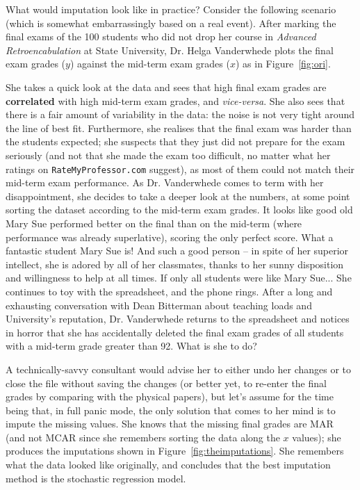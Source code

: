 \afterpage{\FloatBarrier}
What would imputation look like in practice? Consider the following scenario (which is somewhat embarrassingly based on a real event). After marking the final exams of the 100 students who did not drop her course in \textit{Advanced Retroencabulation} at State University, Dr. Helga Vanderwhede plots the final exam grades ($y$) against the mid-term exam grades ($x$) as in Figure~\ref{fig:ori}. \par She takes a quick look at the data and sees that high final exam grades are \textbf{correlated} with high mid-term exam grades, and \textit{vice-versa}. She also sees that there is a fair amount of variability in the data: the noise is not very tight around the line of best fit. Furthermore, she realises that the final exam was harder than the students expected; she suspects that they just did not prepare for the exam seriously (and not that she made the exam too difficult, no matter what her ratings on \texttt{RateMyProfessor.com} suggest), as most of them could not match their mid-term exam performance. 
\newl As Dr. Vanderwhede comes to term with her disappointment, she decides to take a deeper look at the numbers, at some point sorting the dataset according to the mid-term exam grades. It looks like good old Mary Sue performed better on the final than on the mid-term (where performance was already superlative), scoring the only perfect score. What a fantastic student Mary Sue is! And such a good person -- in spite of her superior intellect, she is adored by all of her classmates, thanks to her sunny disposition and willingness to help at all times. If only all students were like Mary Sue... She continues to toy with the spreadsheet, and the phone rings. After a long and exhausting conversation with Dean Bitterman about teaching loads and University's reputation, Dr. Vanderwhede returns to the spreadsheet and notices in horror that she has accidentally deleted the final exam grades of all students with a mid-term grade greater than 92. What is she to do? \par A technically-savvy consultant would advise her to either undo her changes or to close the file without saving the changes (or better yet, to re-enter the final grades by comparing with the physical papers), but let's assume for the time being that, in full panic mode, the only solution that comes to her mind is to impute the missing values. She knows that the missing final grades are MAR (and not MCAR since she remembers sorting the data along the $x$ values); she produces the imputations shown in Figure~\ref{fig:theimputations}. She remembers what the data looked like originally, and concludes that the best imputation method is the stochastic regression model.
